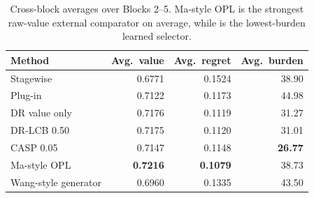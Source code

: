 \begin{table}[!htbp]
\centering
\small
\begin{tabular}{@{}lrrr@{}}
\toprule
Method & Avg.\ value & Avg.\ regret & Avg.\ burden \\
\midrule
Stagewise & 0.6771 & 0.1524 & 38.90 \\
Plug-in & 0.7122 & 0.1173 & 44.98 \\
DR value only & 0.7176 & 0.1119 & 31.27 \\
DR-LCB 0.50 & 0.7175 & 0.1120 & 31.01 \\
CASP 0.05 & 0.7147 & 0.1148 & \textbf{26.77} \\
Ma-style OPL & \textbf{0.7216} & \textbf{0.1079} & 38.73 \\
Wang-style generator & 0.6960 & 0.1335 & 43.50 \\
\bottomrule
\end{tabular}
\caption{Cross-block averages over Blocks 2--5. Ma-style OPL is the strongest raw-value external comparator on average, while \CASP{} is the lowest-burden learned selector.}
\label{tab:crossblock-summary}
\end{table}
